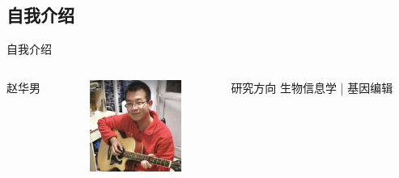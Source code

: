 \subsection{自我介绍}

\begin{frame}{自我介绍}
    \begin{columns}

        \center \large{赵华男}

        \begin{figure}
            \centering
            \includegraphics[width=3cm]{Images/自我介绍1.jpg}
        \end{figure}

        \begin{block}{\tiny{研究方向}}
            \small{生物信息学 | 基因编辑}
        \end{block}
        \bigskip
        \bigskip
        \bigskip
        \bigskip
        \bigskip
        \bigskip
        \bigskip
        \bigskip
        \bigskip
        \bigskip
        \bigskip
        \bigskip


\end{columns}
\end{frame}
